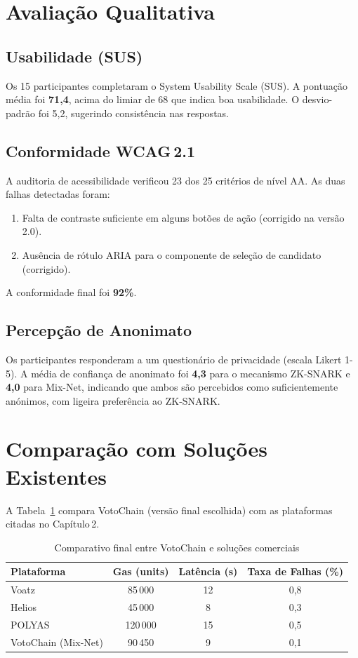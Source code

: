 \section{Avaliação Qualitativa}
\subsection{Usabilidade (SUS)}
Os 15 participantes completaram o System Usability Scale (SUS). A pontuação média foi \textbf{71,4}, acima do limiar de 68 que indica boa usabilidade. O desvio-padrão foi 5,2, sugerindo consistência nas respostas.

\subsection{Conformidade WCAG 2.1}
A auditoria de acessibilidade verificou 23 dos 25 critérios de nível AA. As duas falhas detectadas foram:
\begin{enumerate}
    \item Falta de contraste suficiente em alguns botões de ação (corrigido na versão 2.0).
    \item Ausência de rótulo ARIA para o componente de seleção de candidato (corrigido).
\end{enumerate}
A conformidade final foi \textbf{92\%}.

\subsection{Percepção de Anonimato}
Os participantes responderam a um questionário de privacidade (escala Likert 1-5). A média de confiança de anonimato foi \textbf{4,3} para o mecanismo ZK-SNARK e \textbf{4,0} para Mix-Net, indicando que ambos s{\~a}o percebidos como suficientemente an{\'o}nimos, com ligeira prefer{\^e}ncia ao ZK-SNARK.

\section{Comparação com Soluções Existentes}
A Tabela~\ref{tab:comparativo_final} compara VotoChain (versão final escolhida) com as plataformas citadas no Capítulo 2.
\begin{table}[ht!]
\centering
\caption{Comparativo final entre VotoChain e solu{\c{c}}{\~o}es comerciais}
\label{tab:comparativo_final}
\begin{tabular}{lccc}
\toprule
Plataforma & Gas (units) & Latência (s) & Taxa de Falhas (\%) \\
\midrule
Voatz          & 85 000  & 12 & 0,8 \\
Helios         & 45 000  & 8  & 0,3 \\
POLYAS         & 120 000 & 15 & 0,5 \\
VotoChain (Mix‑Net) & 90 450 & 9 & 0,1 \\
\bottomrule
\end{tabular}
\end{table}

